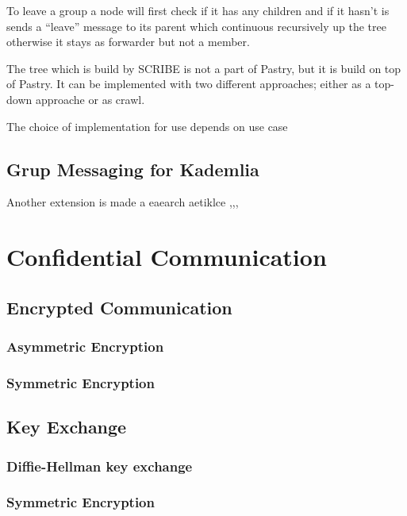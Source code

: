 To leave a group a node will first check if it has any children and if it hasn't is sends a ``leave'' message to its parent which continuous recursively up the tree otherwise it stays as forwarder but not a member.

The tree which is build by SCRIBE is not a part of Pastry, but it is build on top of Pastry. It can be implemented with two different approaches; either as a top-down approache or as crawl.


The choice of implementation for use depends on use case














 
\subsection{Grup Messaging for Kademlia}
Another extension is made a eaearch aetiklce ,,,

\section{Confidential Communication}
\subsection{Encrypted Communication}
\subsubsection{Asymmetric Encryption}
\subsubsection{Symmetric Encryption}

\subsection{Key Exchange}
\subsubsection{Diffie-Hellman key exchange}
\subsubsection{Symmetric Encryption}






